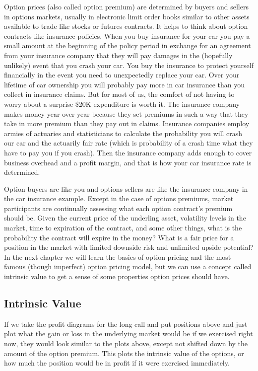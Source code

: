 \documentclass[
]{book}
\begin{document}
Option prices (also called option premium) are determined by buyers and sellers in options markets, usually in electronic limit order books similar to other assets available to trade like stocks or futures contracts. It helps to think about option contracts like insurance policies. When you buy insurance for your car you pay a small amount at the beginning of the policy period in exchange for an agreement from your insurance company that they will pay damages in the (hopefully unlikely) event that you crash your car. You buy the insurance to protect yourself financially in the event you need to unexpectedly replace your car. Over your lifetime of car ownership you will probably pay more in car insurance than you collect in insurance claims. But for most of us, the comfort of not having to worry about a surprise \$20K expenditure is worth it. The insurance company makes money year over year because they set premiums in such a way that they take in more premium than they pay out in claims. Insurance companies employ armies of actuaries and statisticians to calculate the probability you will crash our car and the actuarily fair rate (which is probability of a crash time what they have to pay you if you crash). Then the insurance company adds enough to cover business overhead and a profit margin, and that is how your car insurance rate is determined.

Option buyers are like you and options sellers are like the insurance company in the car insurance example. Except in the case of options premiums, market participants are continually assessing what each option contract's premium should be. Given the current price of the underling asset, volatility levels in the market, time to expiration of the contract, and some other things, what is the probability the contract will expire in the money? What is a fair price for a position in the market with limited downside risk and unlimited upside potential? In the next chapter we will learn the basics of option pricing and the most famous (though imperfect) option pricing model, but we can use a concept called intrinsic value to get a sense of some properties option prices should have.

\hypertarget{intrinsic-value}{%
\subsection{Intrinsic Value}\label{intrinsic-value}}

If we take the profit diagrams for the long call and put positions above and just plot what the gain or loss in the underlying market would be if we exercised right now, they would look similar to the plots above, except not shifted down by the amount of the option premium. This plots the intrinsic value of the options, or how much the position would be in profit if it were exercised immediately.
\end{document}

